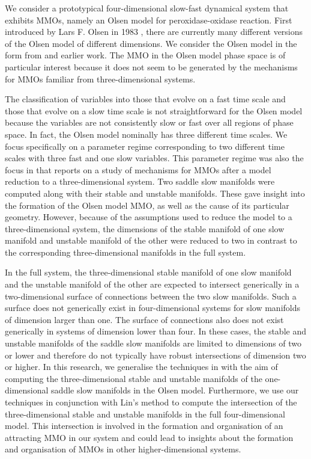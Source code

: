 \documentclass{ws-ijbc}
\begin{document}
We consider a prototypical four-dimensional slow-fast dynamical system that exhibits MMOs, namely an Olsen model for peroxidase-oxidase reaction.  First introduced by Lars F. Olsen in 1983  \cite{Olsen}, there are currently many different versions of the Olsen model of different dimensions.  We consider the Olsen model in the form from \cite{Rescaling} and earlier work.  The MMO in the Olsen model phase space is of particular interest because it does not seem to be generated by the mechanisms for MMOs familiar from three-dimensional systems.

The classification of variables into those that evolve on a fast time scale and those that evolve on a slow time scale is not straightforward for the Olsen model because the variables are not consistently slow or fast over all regions of phase space.  In fact, the Olsen model nominally has three different time scales.  We focus specifically on a parameter regime corresponding to two different time scales with three fast and one slow variables.  This parameter regime was also the focus in \cite{QSSA} that reports on a study of mechanisms for MMOs after a model reduction to a three-dimensional system.  Two saddle slow manifolds were computed along with their stable and unstable manifolds.  These gave insight into the formation of the Olsen model MMO, as well as the cause of its particular geometry.  However, because of the assumptions used to reduce the model to a three-dimensional system, the dimensions of the stable manifold of one slow manifold and unstable manifold of the other were reduced to two in contrast to the corresponding three-dimensional manifolds in the full system.  

In the full system, the three-dimensional stable manifold of one slow manifold and the unstable manifold of the other are expected to intersect generically in a two-dimensional surface of connections between the two slow manifolds.  Such a surface does not generically exist in four-dimensional systems for slow manifolds of dimension larger than one.  The surface of connections also does not exist generically in systems of dimension lower than four.  In these cases, the stable and unstable manifolds of the saddle slow manifolds are limited to dimensions of two or lower and therefore do not typically have robust intersections of dimension two or higher.  In this research, we generalise the techniques in \cite{Saeed_Paper} with the aim of computing the three-dimensional stable and unstable manifolds of the one-dimensional saddle slow manifolds in the Olsen model.  Furthermore, we use our techniques in conjunction with Lin's method to compute the intersection of the three-dimensional stable and unstable manifolds in the full four-dimensional model.  This intersection is involved in the formation and organisation of an attracting MMO in our system and could lead to insights about the formation and organisation of MMOs in other higher-dimensional systems.
\end{document}
